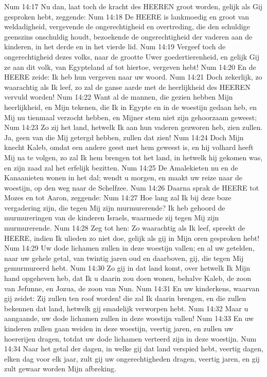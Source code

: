 Num 14:17  Nu dan, laat toch de kracht des HEEREN groot worden, gelijk als Gij gesproken hebt, zeggende:
Num 14:18  De HEERE is lankmoedig en groot van weldadigheid, vergevende de ongerechtigheid en overtreding, die den schuldige geenszins onschuldig houdt, bezoekende de ongerechtigheid der vaderen aan de kinderen, in het derde en in het vierde lid.
Num 14:19  Vergeef toch de ongerechtigheid dezes volks, naar de grootte Uwer goedertierenheid, en gelijk Gij ze aan dit volk, van Egypteland af tot hiertoe, vergeven hebt!
Num 14:20  En de HEERE zeide: Ik heb hun vergeven naar uw woord.
Num 14:21  Doch zekerlijk, zo waarachtig als Ik leef, zo zal de ganse aarde met de heerlijkheid des HEEREN vervuld worden!
Num 14:22  Want al de mannen, die gezien hebben Mijn heerlijkheid, en Mijn tekenen, die Ik in Egypte en in de woestijn gedaan heb, en Mij nu tienmaal verzocht hebben, en Mijner stem niet zijn gehoorzaam geweest;
Num 14:23  Zo zij het land, hetwelk Ik aan hun vaderen gezworen heb, zien zullen. Ja, geen van die Mij getergd hebben, zullen dat zien!
Num 14:24  Doch Mijn knecht Kaleb, omdat een andere geest met hem geweest is, en hij volhard heeft Mij na te volgen, zo zal Ik hem brengen tot het land, in hetwelk hij gekomen was, en zijn zaad zal het erfelijk bezitten.
Num 14:25  De Amalekieten nu en de Kanaanieten wonen in het dal; wendt u morgen, en maakt uw reize naar de woestijn, op den weg naar de Schelfzee.
Num 14:26  Daarna sprak de HEERE tot Mozes en tot Aaron, zeggende:
Num 14:27  Hoe lang zal Ik bij deze boze vergadering zijn, die tegen Mij zijn murmurerende? Ik heb gehoord de murmureringen van de kinderen Israels, waarmede zij tegen Mij zijn murmurerende.
Num 14:28  Zeg tot hen: Zo waarachtig als Ik leef, spreekt de HEERE, indien Ik ulieden zo niet doe, gelijk als gij in Mijn oren gesproken hebt!
Num 14:29  Uw dode lichamen zullen in deze woestijn vallen; en al uw getelden, naar uw gehele getal, van twintig jaren oud en daarboven, gij, die tegen Mij gemurmureerd hebt.
Num 14:30  Zo gij in dat land komt, over hetwelk Ik Mijn hand opgeheven heb, dat Ik u daarin zou doen wonen, behalve Kaleb, de zoon van Jefunne, en Jozua, de zoon van Nun.
Num 14:31  En uw kinderkens, waarvan gij zeidet: Zij zullen ten roof worden! die zal Ik daarin brengen, en die zullen bekennen dat land, hetwelk gij smadelijk verworpen hebt.
Num 14:32  Maar u aangaande, uw dode lichamen zullen in deze woestijn vallen!
Num 14:33  En uw kinderen zullen gaan weiden in deze woestijn, veertig jaren, en zullen uw hoererijen dragen, totdat uw dode lichamen verteerd zijn in deze woestijn.
Num 14:34  Naar het getal der dagen, in welke gij dat land verspied hebt, veertig dagen, elken dag voor elk jaar, zult gij uw ongerechtigheden dragen, veertig jaren, en gij zult gewaar worden Mijn afbreking.
